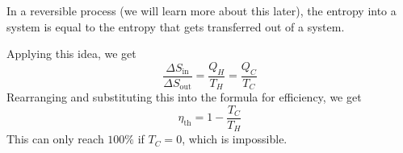 \begin{itemize}
    \begin{idea}
        In a reversible process (we will learn more about this later), the entropy into a system is equal to the entropy that gets transferred out of a system.
    \end{idea}
    Applying this idea, we get
    \begin{equation}
        \frac{\Delta S_\text{in}}{\Delta S_\text{out}} = \frac{Q_H}{T_H} = \frac{Q_C}{T_C}
    \end{equation}
    Rearranging and substituting this into the formula for efficiency, we get
    \begin{equation}
        \eta_\text{th} = 1 - \frac{T_C}{T_H}
    \end{equation}
    This can only reach $100\%$ if $T_C=0$, which is impossible.
\end{itemize}
